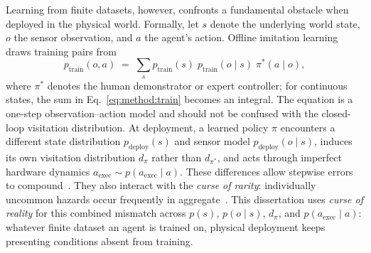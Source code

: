 Learning from finite datasets, however, confronts a fundamental obstacle when deployed in the physical world. Formally, let $s$ denote the underlying world state, $o$ the sensor observation, and $a$ the agent's action. Offline imitation learning draws training pairs from
\begin{equation}
  p_{\mathrm{train}}(o,a) \;=\; \sum_{s} p_{\mathrm{train}}(s)\; p_{\mathrm{train}}(o \mid s)\; \pi^{*}(a \mid o),
  \label{eq:method:train}
\end{equation}
where $\pi^{*}$ denotes the human demonstrator or expert controller; for continuous states, the sum in Eq.~\eqref{eq:method:train} becomes an integral. The equation is a one-step observation--action model and should not be confused with the closed-loop visitation distribution. At deployment, a learned policy $\pi$ encounters a different state distribution $p_{\mathrm{deploy}}(s)$ and sensor model $p_{\mathrm{deploy}}(o \mid s)$, induces its own visitation distribution $d_{\pi}$ rather than $d_{\pi^{*}}$, and acts through imperfect hardware dynamics $a_{\mathrm{exec}} \sim p(a_{\mathrm{exec}} \mid a)$. These differences allow stepwise errors to compound~\cite{ross2010efficient,ross2011dagger}. They also interact with the \emph{curse of rarity}: individually uncommon hazards occur frequently in aggregate~\cite{liu2024curse}. This dissertation uses \emph{curse of reality} for this combined mismatch across $p(s)$, $p(o \mid s)$, $d_{\pi}$, and $p(a_{\mathrm{exec}} \mid a)$: whatever finite dataset an agent is trained on, physical deployment keeps presenting conditions absent from training.

